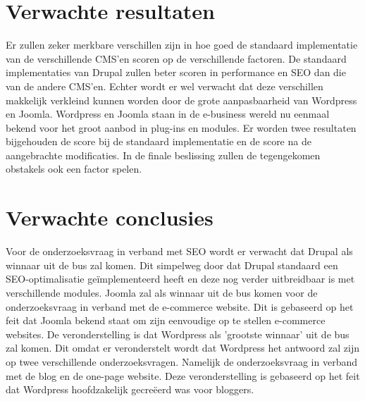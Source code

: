 \section{Verwachte resultaten}
\label{sec:verwachte_resultaten}

Er zullen zeker merkbare verschillen zijn in hoe goed de standaard implementatie van de verschillende CMS'en scoren op de verschillende factoren. De standaard implementaties van Drupal zullen beter scoren in performance en SEO dan die van de andere CMS'en. Echter wordt er wel verwacht dat deze verschillen makkelijk verkleind kunnen worden door de grote aanpasbaarheid van Wordpress en Joomla. Wordpress en Joomla staan in de e-business wereld nu eenmaal bekend voor het groot aanbod in plug-ins en modules. Er worden twee resultaten bijgehouden de score bij de standaard implementatie en de score na de aangebrachte modificaties. In de finale beslissing zullen de tegengekomen obstakels ook een factor spelen.

\section{Verwachte conclusies}
\label{sec:verwachte_conclusies}

Voor de onderzoeksvraag in verband met SEO wordt er verwacht dat Drupal als winnaar uit de bus zal komen. Dit simpelweg door dat Drupal standaard een SEO-optimalisatie geïmplementeerd heeft en deze nog verder uitbreidbaar is met verschillende modules. Joomla zal als winnaar uit de bus komen voor de onderzoeksvraag in verband met de e-commerce website. Dit is gebaseerd op het feit dat Joomla bekend staat om zijn eenvoudige op te stellen e-commerce websites. De veronderstelling is dat Wordpress als 'grootste winnaar' uit de bus zal komen. Dit omdat er veronderstelt wordt dat Wordpress het antwoord zal zijn op twee verschillende onderzoeksvragen. Namelijk de onderzoeksvraag in verband met de blog en de one-page website. Deze veronderstelling is gebaseerd op het feit dat Wordpress hoofdzakelijk gecreëerd was voor bloggers.
